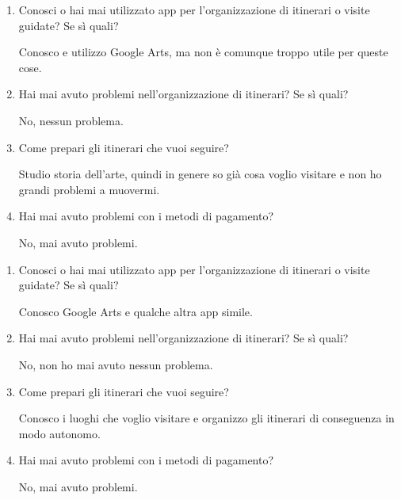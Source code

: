 
\begin{enumerate}

\item Conosci o hai mai utilizzato app per l'organizzazione di itinerari o visite guidate? Se sì quali?

Conosco e utilizzo Google Arts, ma non è comunque troppo utile per queste cose.

\item Hai mai avuto problemi nell'organizzazione di itinerari? Se sì quali?

No, nessun problema.

\item Come prepari gli itinerari che vuoi seguire?

Studio storia dell'arte, quindi in genere so già cosa voglio visitare e non ho grandi problemi a muovermi.

\item Hai mai avuto problemi con i metodi di pagamento?

No, mai avuto problemi.

\end{enumerate}


\begin{enumerate}

\item Conosci o hai mai utilizzato app per l'organizzazione di itinerari o visite guidate? Se sì quali?

Conosco Google Arts e qualche altra app simile.

\item Hai mai avuto problemi nell'organizzazione di itinerari? Se sì quali?

No, non ho mai avuto nessun problema.

\item Come prepari gli itinerari che vuoi seguire?

Conosco i luoghi che voglio visitare e organizzo gli itinerari di conseguenza in modo autonomo.

\item Hai mai avuto problemi con i metodi di pagamento?

No, mai avuto problemi.

\end{enumerate}


